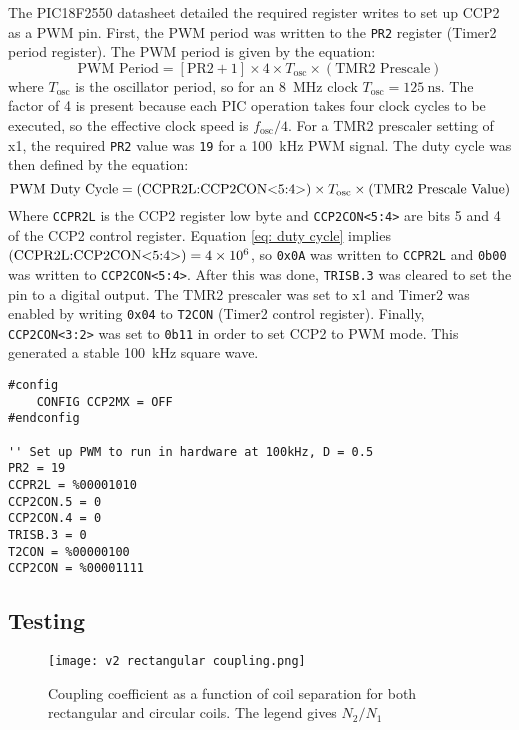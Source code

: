 The PIC18F2550 datasheet \cite{pic18f2550} detailed the required register writes to set up CCP2 as a PWM pin. First, the PWM period was written to the \verb|PR2| register (Timer2 period register). The PWM period is given by the equation:
\begin{equation}
\text{PWM Period} = [\text{PR2}+1] \times 4 \times T_\text{osc} \times (\text{TMR2 Prescale})
\end{equation}
where $T_\text{osc}$ is the oscillator period, so for an \SI{8}{\mega\hertz} clock $T_\text{osc}=\SI{125}{\nano\second}$. The factor of 4 is present because each PIC operation takes four clock cycles to be executed, so the effective clock speed is $f_\text{osc}/4$. For a TMR2 prescaler setting of x1, the required \verb|PR2| value was \verb|19| for a \SI{100}{\kilo\hertz} PWM signal. The duty cycle was then defined by the equation:
\begin{equation}
\text{PWM Duty Cycle} = (\text{CCPR2L:CCP2CON\textless5:4\textgreater}) \times T_\text{osc} \times (\text{TMR2 Prescale Value}) \label{eq: duty cycle}
\end{equation}
Where \verb|CCPR2L| is the CCP2 register low byte and \verb|CCP2CON<5:4>| are bits 5 and 4 of the CCP2 control register. Equation \ref{eq: duty cycle} implies $(\text{CCPR2L:CCP2CON\textless5:4\textgreater}) = \num{4e6}$, so \verb|0x0A| was written to \verb|CCPR2L| and \verb|0b00| was written to \verb|CCP2CON<5:4>|. After this was done, \verb|TRISB.3| was cleared to set the pin to a digital output. The TMR2 prescaler was set to x1 and Timer2 was enabled by writing \verb|0x04| to \verb|T2CON| (Timer2 control register). Finally, \verb|CCP2CON<3:2>| was set to \verb|0b11| in order to set CCP2 to PWM mode. This generated a stable \SI{100}{\kilo\hertz} square wave.

\begin{lstlisting}
#config
    CONFIG CCP2MX = OFF
#endconfig

'' Set up PWM to run in hardware at 100kHz, D = 0.5
PR2 = 19
CCPR2L = %00001010
CCP2CON.5 = 0
CCP2CON.4 = 0
TRISB.3 = 0
T2CON = %00000100
CCP2CON = %00001111
\end{lstlisting}




\subsection{Testing}
\begin{figure}[htb]
	\centering
	\texttt{[image: v2 rectangular coupling.png]}
	\caption{Coupling coefficient as a function of coil separation for both rectangular and circular coils. The legend gives $N_2/N_1$}
	\label{fig: rectangular coupling}
\end{figure}


